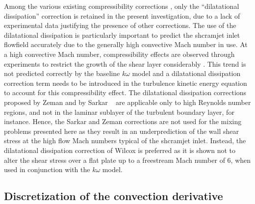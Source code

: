 Among the various existing
compressibility corrections \cite{nasa:1978:sislian,thesis:1996:krishnamurty,
nasa:1994:coakley}, only the ``dilatational dissipation'' correction
\cite{misc:1990:zeman,jfm:1991:sarkar,aiaa:1992:wilcox} is retained in the
present investigation, due to a lack of experimental data justifying the presence of
other corrections. The use of the dilatational dissipation is particularly important
to predict the shcramjet inlet flowfield accurately due to the generally
high convective Mach number
in use. At a high convective Mach number,
compressibility effects are observed through experiments to restrict the growth
of the shear layer considerably \cite{jfm:1988:papamoschou,aiaabook:1991:dimotakis}.
This trend is not predicted correctly by the baseline $k\omega$ model and
a dilatational dissipation correction term needs to be introduced in the turbulence
kinetic energy equation to account for this compressibility effect. The dilatational
dissipation corrections proposed by Zeman \cite{misc:1990:zeman}
and by Sarkar \etal\ \cite{jfm:1991:sarkar} are applicable only to high
Reynolds number regions, and not in the laminar sublayer of the turbulent
boundary layer, for instance. Hence, the Sarkar and Zeman corrections are not
used for the mixing problems presented here as they result in an underprediction of
the wall shear
stress at the high flow Mach numbers typical of the shcramjet inlet. Instead,
the dilatational dissipation correction
of Wilcox \cite{aiaa:1992:wilcox} is preferred as it is shown not to alter the
shear stress over a flat plate up to a freestream Mach number of 6,
when used in conjunction with the $k\omega$ model.


\subsection{Discretization of the convection derivative}

